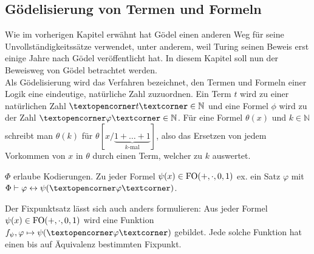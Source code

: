 \subsection{Gödelisierung von Termen und Formeln}

Wie im vorherigen Kapitel erwähnt hat Gödel einen anderen Weg für seine Unvollständigkeitssätze verwendet, unter anderem, weil Turing seinen Beweis erst einige Jahre nach Gödel veröffentlicht hat. In diesem Kapitel soll nun der Beweisweg von Gödel betrachtet werden.
\\
Als Gödelisierung wird das Verfahren bezeichnet, den Termen und Formeln einer Logik eine eindeutige, natürliche Zahl zuzuordnen. Ein Term $t$ wird zu einer natürlichen Zahl $\opencorner t\closecorner\in \mathbb{N}$ und eine Formel $\phi$ wird zu der Zahl $\opencorner\varphi\closecorner\in \mathbb{N}$. Für eine Formel $\theta(x)$ und $k\in \mathbb{N}$ schreibt man $\theta(k)$ für $\theta[x/\underbrace{1+\dots+1}_{k\text{-mal}}]$, also das Ersetzen von jedem Vorkommen von $x$ in $\theta$ durch einen Term, welcher zu $k$ auswertet.

\begin{satz}[Fixpunktsatz]
	$\Phi$ erlaube Kodierungen. Zu jeder Formel $\psi(x)\in \operatorname{FO}({+,\cdot,0,1})$ ex. ein Satz $\varphi$ mit $\Phi\vdash\varphi\leftrightarrow\psi(\opencorner \varphi \closecorner)$.
\end{satz}

Der Fixpunktsatz lässt sich auch anders formulieren: Aus jeder Formel $\psi(x)\in \operatorname{FO}({+,\cdot,0,1})$ wird eine Funktion $f_\psi, \varphi\mapsto\psi(\opencorner\varphi\closecorner)$ gebildet. Jede solche Funktion hat einen bis auf Äquivalenz bestimmten Fixpunkt.

